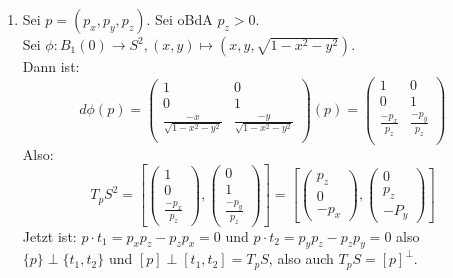 \begin{solution}
\begin{enumerate}[label=(\alph*)]
    \item Sei \( p = (p_x, p_y, p_z) \). Sei oBdA \( p_z > 0 \). \\
    Sei \( \phi : B_1(0) \to S^2, (x,y) \mapsto (x,y,\sqrt{ 1- x^2-y^2}) \). \\
    Dann ist:
    \begin{equation*} 
      d \phi(p) = 
      \begin{pmatrix}
        1 & 0 \\
        0 & 1 \\
        \frac{-x}{\sqrt{ 1 - x^2 -y^2}} & \frac{-y}{\sqrt{ 1 - x^2 -y^2}} \\
      \end{pmatrix}(p) = 
      \begin{pmatrix}
        1 & 0 \\
        0 & 1 \\
        \frac{-p_x}{p_z} & \frac{-p_y}{p_z} \\
      \end{pmatrix} 
    \end{equation*}
    Also:
    \begin{equation*}
      {T_p S}^2 = \left[
      \begin{pmatrix}
        1 \\
        0 \\
        \frac{-p_x}{p_z}
      \end{pmatrix},
      \begin{pmatrix}
        0 \\
        1 \\
        \frac{-p_y}{p_z}
      \end{pmatrix}
      \right] = \left[
      \begin{pmatrix}
        p_z\\
        0 \\
        -p_x
      \end{pmatrix},
      \begin{pmatrix}
        0 \\
        p_z \\
        -P_y
      \end{pmatrix}
      \right]
    \end{equation*}
    Jetzt ist: \( p \cdot t_1 = p_x p_z - p_z p_x = 0 \) und \( p \cdot t_2 = p_y p_z - p_z p_y = 0 \) also \\
    \( \{ p \} \perp \{ t_1,t_2 \} \) und \( [p] \perp [t_1,t_2] = T_p S \), also auch \( T_p S = {[p]}^{\perp} \).
  \end{enumerate}
\end{solution}


